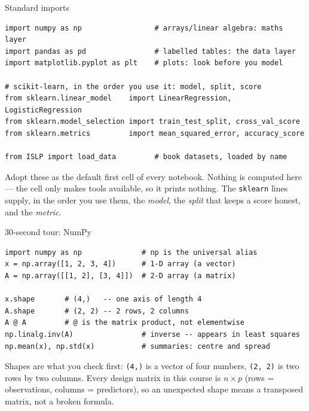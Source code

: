 \documentclass[aspectratio=169,11pt]{beamer}
\begin{document}
\begin{frame}[fragile]{Standard imports}
  \begin{lstlisting}
import numpy as np                 # arrays/linear algebra: maths layer
import pandas as pd                # labelled tables: the data layer
import matplotlib.pyplot as plt    # plots: look before you model

# scikit-learn, in the order you use it: model, split, score
from sklearn.linear_model    import LinearRegression, LogisticRegression
from sklearn.model_selection import train_test_split, cross_val_score
from sklearn.metrics         import mean_squared_error, accuracy_score

from ISLP import load_data         # book datasets, loaded by name
  \end{lstlisting}
  \begin{readme}
    Adopt these as the default first cell of every notebook. Nothing is
    computed here --- the cell only makes tools available, so it prints
    nothing. The \texttt{sklearn} lines supply, in the order you use them, the
    \emph{model}, the \emph{split} that keeps a score honest, and the
    \emph{metric}.
  \end{readme}
\end{frame}

\begin{frame}[fragile]{30-second tour: NumPy}
  \begin{lstlisting}
import numpy as np              # np is the universal alias
x = np.array([1, 2, 3, 4])      # 1-D array (a vector)
A = np.array([[1, 2], [3, 4]])  # 2-D array (a matrix)

x.shape       # (4,)   -- one axis of length 4
A.shape       # (2, 2) -- 2 rows, 2 columns
A @ A         # @ is the matrix product, not elementwise
np.linalg.inv(A)                # inverse -- appears in least squares
np.mean(x), np.std(x)           # summaries: centre and spread
  \end{lstlisting}
  \begin{readme}
    Shapes are what you check first: \texttt{(4,)} is a vector of four numbers,
    \texttt{(2, 2)} is two rows by two columns. Every design matrix in this
    course is $n \times p$ (rows = observations, columns = predictors), so an
    unexpected shape means a transposed matrix, not a broken formula.
  \end{readme}
\end{frame}
\end{document}
